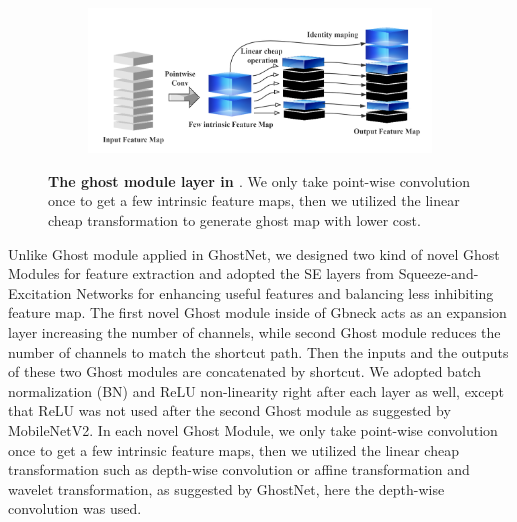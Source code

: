 \begin{figure}[h]
	\begin{center}
		
		\begin{subfigure}[b]{\textwidth}
		    \centering
			\includegraphics[width=\textwidth]{thesis-template-master/images/ghostmodule.png}
			
			\label{fig:cellnet}
		\end{subfigure}
	\end{center}
	\caption{\textbf{The ghost module layer in \cite{19}}. We only take point-wise convolution once to get a few intrinsic feature maps, then we utilized the linear cheap transformation to generate ghost map with lower cost.}
\end{figure}

Unlike Ghost module applied in GhostNet\cite{19}, we designed two kind of novel Ghost Modules for feature extraction and adopted the SE layers from Squeeze-and-Excitation Networks \cite{24} for enhancing useful features and balancing less inhibiting feature map. The first novel Ghost module inside of Gbneck acts as an expansion layer increasing the number of channels, while second Ghost module reduces the number of channels to match the shortcut path. Then the inputs and the outputs of these two Ghost modules are concatenated by shortcut. We adopted batch normalization (BN) and ReLU non-linearity right after each layer as well\cite{19}, except that ReLU was not used after the second Ghost module as suggested by MobileNetV2\cite{30}. In each novel Ghost Module, we only take point-wise convolution once to get a few intrinsic feature maps, then we utilized the linear cheap transformation such as depth-wise convolution or affine transformation and wavelet transformation, as suggested by GhostNet\cite{19}, here the depth-wise convolution was used.

